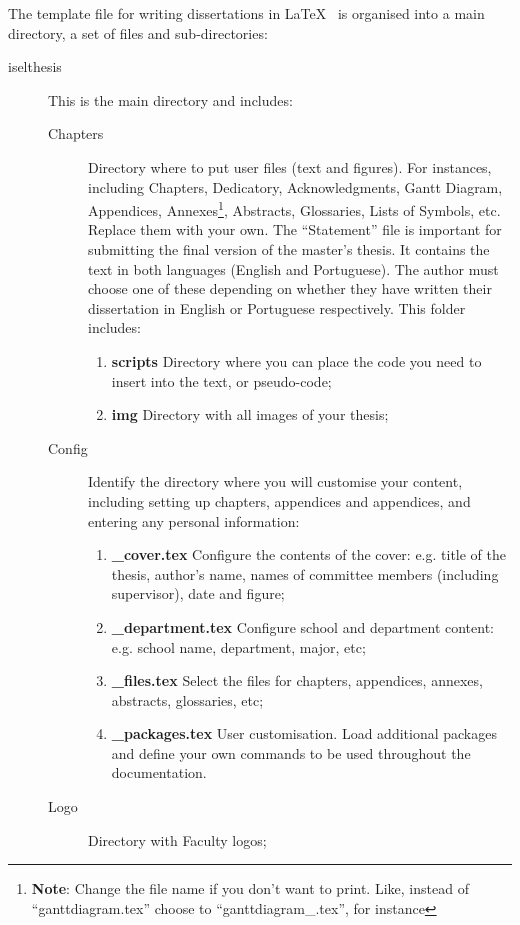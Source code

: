 The template file for writing dissertations in  \LaTeX~ is organised into a main directory, a set of files and sub-directories:
\begin{description}
	\item[iselthesis] This is the main directory and includes:
	\begin{description}
        \item[Chapters] Directory where to put user files (text and figures). For instances, including Chapters, Dedicatory, Acknowledgments, Gantt Diagram, Appendices, Annexes\footnote{\textbf{Note}: Change the file name if you don't want to print. Like, instead of ``ganttdiagram.tex'' choose to ``ganttdiagram\_.tex'', for instance}, Abstracts, Glossaries, Lists of Symbols, etc. Replace them with your own. The ``Statement'' file is important for submitting the final version of the master's thesis. It contains the text in both languages (English and Portuguese). The author must choose one of these depending on whether they have written their dissertation in English or Portuguese respectively. This folder includes:
		\begin{enumerate}
		\item \textbf{scripts} Directory where you can place the code you need to insert into the text, or pseudo-code;
		\item \textbf{img} Directory with all images of your thesis;
		\end{enumerate}
        \item[Config] Identify the directory where you will customise your content, including setting up chapters, appendices and appendices, and entering any personal information:
		\begin{enumerate}
		\item \textbf{\_cover.tex} Configure the contents of the cover: e.g. title of the thesis, author's name, names of committee members (including supervisor), date and figure;
		\item \textbf{\_department.tex} Configure school and department content: e.g. school name, department, major, etc;
        \item \textbf{\_files.tex} Select the files for chapters, appendices, annexes, abstracts, glossaries, etc;
        \item \textbf{\_packages.tex} User customisation. Load additional packages and define your own commands to be used throughout the documentation.
		\end{enumerate}
		\item[Logo] Directory with Faculty logos;

\end{description}
\end{description}
